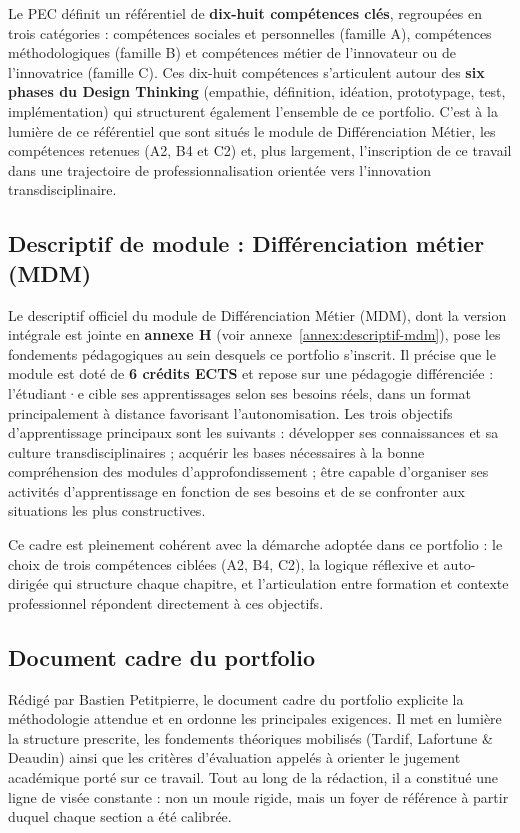 Le PEC définit un référentiel de \textbf{dix-huit compétences clés}, regroupées en trois catégories : compétences sociales et personnelles (famille A), compétences méthodologiques (famille B) et compétences métier de l'innovateur ou de l'innovatrice (famille C). Ces dix-huit compétences s'articulent autour des \textbf{six phases du Design Thinking} (empathie, définition, idéation, prototypage, test, implémentation) qui structurent également l'ensemble de ce portfolio. C'est à la lumière de ce référentiel que sont situés le module de Différenciation Métier, les compétences retenues (A2, B4 et C2) et, plus largement, l'inscription de ce travail dans une trajectoire de professionnalisation orientée vers l'innovation transdisciplinaire.

\subsection*{Descriptif de module : Différenciation métier (MDM)}

Le descriptif officiel du module de Différenciation Métier (MDM), dont la version intégrale est jointe en \textbf{annexe H} (voir annexe~\ref{annex:descriptif-mdm}), pose les fondements pédagogiques au sein desquels ce portfolio s'inscrit. Il précise que le module est doté de \textbf{6 crédits ECTS} et repose sur une pédagogie différenciée : l'étudiant·e cible ses apprentissages selon ses besoins réels, dans un format principalement à distance favorisant l'autonomisation. Les trois objectifs d'apprentissage principaux sont les suivants : développer ses connaissances et sa culture transdisciplinaires ; acquérir les bases nécessaires à la bonne compréhension des modules d'approfondissement ; être capable d'organiser ses activités d'apprentissage en fonction de ses besoins et de se confronter aux situations les plus constructives.

Ce cadre est pleinement cohérent avec la démarche adoptée dans ce portfolio : le choix de trois compétences ciblées (A2, B4, C2), la logique réflexive et auto-dirigée qui structure chaque chapitre, et l'articulation entre formation et contexte professionnel répondent directement à ces objectifs.

\subsection*{Document cadre du portfolio}

Rédigé par Bastien Petitpierre, le document cadre du portfolio explicite la méthodologie attendue et en ordonne les principales exigences. Il met en lumière la structure prescrite, les fondements théoriques mobilisés (Tardif, Lafortune \& Deaudin) ainsi que les critères d'évaluation appelés à orienter le jugement académique porté sur ce travail. Tout au long de la rédaction, il a constitué une ligne de visée constante : non un moule rigide, mais un foyer de référence à partir duquel chaque section a été calibrée.

